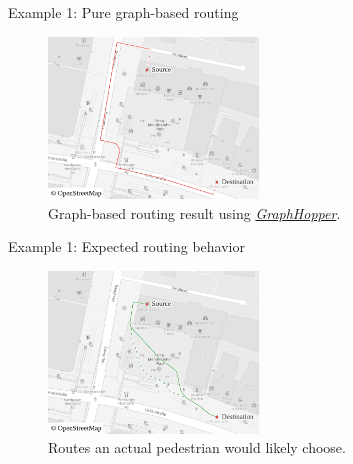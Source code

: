 \documentclass{beamer}
\newenvironment{figcenter}
{%
	\parskip=0pt%
	\par%
	\nopagebreak%
	\centering%
}%
{%
	\par%
	\noindent%
	\ignorespacesafterend%
}
\begin{document}
		\begin{frame}{Example 1: Pure graph-based routing}
			\begin{figure}[t]
				\begin{figcenter}
					\includegraphics[width=0.5\textwidth]{images/qgis-routing-osterstrasse_routing.pdf}
				\end{figcenter}
				\caption{Graph-based routing result using \href{https://www.osm.org/directions?engine=graphhopper\_foot\&route=53.57657,9.95210;53.57601,9.95268}{\emph{GraphHopper}}.}
			\end{figure}
		\end{frame}
		
		\begin{frame}{Example 1: Expected routing behavior}
			\begin{figure}[t]
				\begin{figcenter}
					\includegraphics[width=0.5\textwidth]{images/qgis-routing-osterstrasse_expected.pdf}
				\end{figcenter}
				\caption{Routes an actual pedestrian would likely choose.}
			\end{figure}
		\end{frame}
		
		
\end{document}
